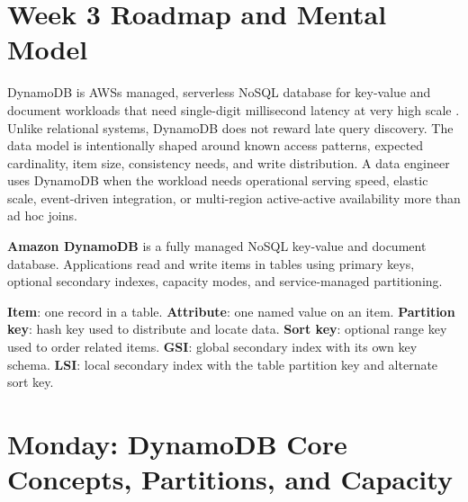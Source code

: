 \section{Week 3 Roadmap and Mental Model}
DynamoDB is AWS\textquotesingle{}s managed, serverless NoSQL database for key-value and document workloads that need single-digit millisecond latency at very high scale \cite{awsDynamoDBDeveloperGuide}. Unlike relational systems, DynamoDB does not reward late query discovery. The data model is intentionally shaped around known access patterns, expected cardinality, item size, consistency needs, and write distribution. A data engineer uses DynamoDB when the workload needs operational serving speed, elastic scale, event-driven integration, or multi-region active-active availability more than ad hoc joins.
\begin{definitionbox}
\textbf{Amazon DynamoDB} is a fully managed NoSQL key-value and document database. Applications read and write items in tables using primary keys, optional secondary indexes, capacity modes, and service-managed partitioning.
\end{definitionbox}
\begin{keyterms}
\textbf{Item}: one record in a table. \textbf{Attribute}: one named value on an item. \textbf{Partition key}: hash key used to distribute and locate data. \textbf{Sort key}: optional range key used to order related items. \textbf{GSI}: global secondary index with its own key schema. \textbf{LSI}: local secondary index with the table partition key and alternate sort key.
\end{keyterms}
\section{Monday: DynamoDB Core Concepts, Partitions, and Capacity}
